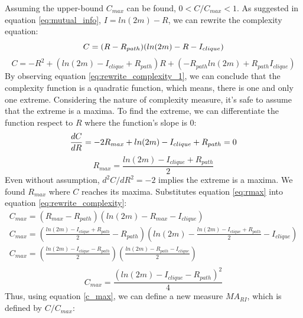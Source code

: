 \documentclass[12pt]{article}
\begin{document}
Assuming the upper-bound $C_{max}$ can be found, $0<C/C_{max}<1$. As suggested in equation \ref{eq:mutual_info}, $I = ln(2m)-R$, we can rewrite the complexity equation:\\
\begin{equation}
    \label{eq:rewrite_complexity}
     C = (R-R_{path})(ln(2m)-R-I_{clique})\\
\end{equation}
\begin{equation}
    \label{eq:rewrite_complexity_1}
    C = -R^2+(ln(2m)-I_{clique}+R_{path})R+(-R_{path}ln(2m)+R_{path}I_{clique})
\end{equation}
By observing equation \ref{eq:rewrite_complexity_1}, we can conclude that the complexity function is a quadratic function, which means, there is one and only one extreme. Considering the nature of complexity measure, it's safe to assume that the extreme is a maxima. To find the extreme, we can differentiate the function respect to $R$ where the function's slope is 0:
\begin{equation}
    \label{eq:mari_diff}
        \frac{dC}{dR} = -2R_{max}+ln(2m)-I_{clique}+R_{path} = 0\\
\end{equation}
\begin{equation}
    \label{eq:rmax}
    R_{max} = \frac{ln(2m)-I_{clique}+R_{path}}{2}
\end{equation}
\noindent
Even without assumption, $d^2C/dR^2 = -2$ implies the extreme is a maxima. We found $R_{max}$ where $C$ reaches its maxima. 
Substitutes equation \ref{eq:rmax} into equation \ref{eq:rewrite_complexity}:\\
\begin{equation}
    \begin{gathered}
        C_{max} =(R_{max}-R_{path})(ln(2m)-R_{max}-I_{clique})\\
        C_{max} = (\frac{ln(2m)-I_{clique}+R_{path}}{2}-R_{path})(ln(2m)-\frac{ln(2m)-I_{clique}+R_{path}}{2}-I_{clique})\\
        C_{max} = (\frac{ln(2m)-I_{clique}-R_{path}}{2})(\frac{ln(2m)-R_{path}-I_{clique}}{2})\\
    \end{gathered}
\end{equation}
\begin{equation}
    \label{c_max}
    C_{max} = \frac{(ln(2m)-I_{clique}-R_{path})^2}{4}
\end{equation}
\noindent
Thus, using equation \ref{c_max}, we can define a new measure $MA_{RI}$, which is defined by $C/C_{max}$:\\
\end{document}
